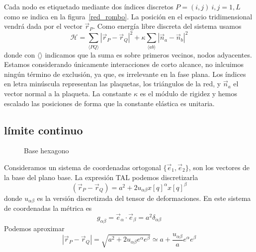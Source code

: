 Cada nodo es etiquetado mediante dos índices discretos $P=(i,j)\ i,j=1,L$
como se indica en la figura~\ref{red_rombo}. La posición en el espacio
tridimensional vendrá dada por el vector $\vec{r}_P$. Como energía libre discreta del sistema usamos
\begin{equation}
\mathcal{H}=\sum_{\langle PQ \rangle}
|\vec{r}_P-\vec{r}_Q|^2+\kappa\sum_{\langle ab \rangle}
|\vec{n}_a-\vec{n}_b|^2 
\end{equation}
donde con $\langle\rangle$ indicamos que la suma es sobre primeros vecinos,
nodos adyacentes. Estamos considerando únicamente interacciones de corto
alcance,  no inlcuimos ningún término de exclusión, ya que, es irrelevante en
la fase plana. Los  índices en letra minúscula representan las plaquetas, 
los triángulos de la red, y $\vec{n}_{a}$ el vector normal a la plaqueta. La
constante $\kappa$ es el módulo de rigidez y hemos escalado las posiciones de
forma que la constante elástica es unitaria.


\subsection{límite continuo}
\begin{figure}[h]
\centering
 \resizebox{\columnwidth}{!}{}
\caption{Base hexagono}
\end{figure}   
Consideramos un sistema de coordenadas ortogonal $\{ \vec{e}_1,\vec{e}_2\}$, son los vectores de la base del plano base. La expresión TAL podemos discretizarla
\begin{equation}
(\vec{r}_P-\vec{r}_Q)=a^2+2u_{\alpha\beta}x{\scriptstyle [q]}^{\alpha}x{\scriptstyle [q]}^{\beta}
\end{equation}
donde $u_{\alpha\beta}$ es la versión discretizada del tensor de
deformaciones. En este  sistema de coordenadas la métrica es
\begin{equation}
g_{\alpha\beta}=\vec{e}_{\alpha}\cdot\vec{e}_{\beta}=a^2\delta_{\alpha\beta}
\end{equation}
Podemos aproximar
\begin{equation}
|\vec{r}_P-\vec{r}_Q|=\sqrt{a^2+2u_{\alpha\beta}e^{\alpha}e^{\beta}}\simeq a + \frac{u_{\alpha\beta}}{a}e^{\alpha}e^{\beta}
\end{equation}



